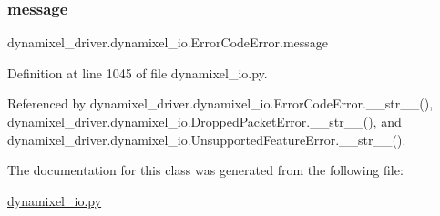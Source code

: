 \subsubsection{\texorpdfstring{message}{message}}
{\footnotesize\ttfamily dynamixel\+\_\+driver.\+dynamixel\+\_\+io.\+Error\+Code\+Error.\+message}



Definition at line 1045 of file dynamixel\+\_\+io.\+py.



Referenced by dynamixel\+\_\+driver.\+dynamixel\+\_\+io.\+Error\+Code\+Error.\+\_\+\+\_\+str\+\_\+\+\_\+(), dynamixel\+\_\+driver.\+dynamixel\+\_\+io.\+Dropped\+Packet\+Error.\+\_\+\+\_\+str\+\_\+\+\_\+(), and dynamixel\+\_\+driver.\+dynamixel\+\_\+io.\+Unsupported\+Feature\+Error.\+\_\+\+\_\+str\+\_\+\+\_\+().



The documentation for this class was generated from the following file\+:\begin{DoxyCompactItemize}
\item 
\hyperlink{dynamixel__io_8py}{dynamixel\+\_\+io.\+py}\end{DoxyCompactItemize}
